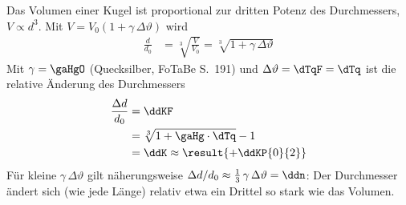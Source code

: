 Das Volumen einer Kugel ist proportional zur dritten Potenz des Durchmessers, $V \propto d^3$. Mit $V = V_0\left(1+\gamma\,\Delta\vartheta\right)$ wird
\begin{align}
 \frac{d}{d_0} &= \sqrt[3]{\frac{V}{V_0}} = \sqrt[3]{1+\gamma\,\Delta\vartheta}
\end{align}
Mit $\gamma = \gaHgO$ (Quecksilber, FoTaBe S.~191) und $\Delta\vartheta = \dTqF = \dTq$ ist die relative Änderung des Durchmessers
\begin{align}
 \frac{\Delta d}{d_0} &= \ddKF \\
   &= \sqrt[3]{1+\gaHg\cdot\dTq}-1 \\
   &= \ddK \approx \result{+\ddKP{0}{2}}
\end{align}
Für kleine $\gamma\,\Delta\vartheta$ gilt näherungsweise $\Delta d/d_0 \approx \frac{1}{3}\,\gamma\,\Delta\vartheta = \ddn$: Der Durchmesser ändert sich (wie jede Länge) relativ etwa ein Drittel so stark wie das Volumen.
